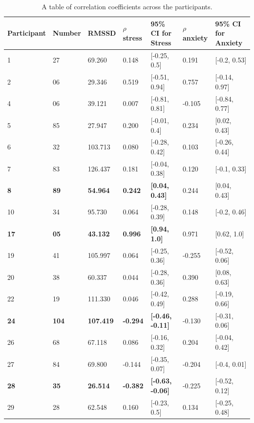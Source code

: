 \documentclass[11pt, a4paper, oneside]{article}
\begin{document}
\begin{table}[H]
    \centering
    \caption{A table of correlation coefficients across the participants.}
    \begin{tabularx}{\textwidth}{XXXXXXX}
        \toprule
        \textbf{Participant} & \textbf{Number} & \textbf{RMSSD} & \textbf{${\rho}$ stress} & \textbf{95\% CI for Stress} & \textbf{${\rho}$ anxiety} & \textbf{95\% CI for Anxiety}\\
        \midrule
        1    & 27   & 69.260  & 0.148 & [-0.25, 0.5] & 0.191 & [-0.2, 0.53]\\
        2    & 06   & 29.346  & 0.519 & [-0.51, 0.94]& 0.757 &[-0.14, 0.97]\\
        4    & 06   & 39.121  & 0.007 & [-0.81, 0.81] & -0.105 &[-0.84, 0.77]\\
        5    & 85   & 27.947  & 0.200 & [-0.01, 0.4] & 0.234 & [0.02, 0.43]\\
        6    & 32   & 103.713& 0.080 & [-0.28, 0.42] & 0.103 &[-0.26, 0.44]\\
        7    & 83   & 126.437 & 0.181 & [-0.04, 0.38] & 0.120 & [-0.1, 0.33]\\
        \textbf{8}    & \textbf{89}   & \textbf{54.964}   & \textbf{0.242} & \textbf{[0.04, 0.43]} & 0.244 & [0.04, 0.43]\\
        10  & 34   & 95.730   & 0.064 & [-0.28, 0.39] & 0.148 & [-0.2, 0.46]\\
        \textbf{17}  & \textbf{05}   & \textbf{43.132}    & \textbf{0.996} & \textbf{[0.94, 1.0]} & 0.971 & [0.62, 1.0]\\
        19  & 41   & 105.997 & 0.064 & [-0.25, 0.36] & -0.255 &[-0.52, 0.06]\\
        20  & 38   & 60.337   & 0.044 & [-0.28, 0.36] & 0.390 & [0.08, 0.63]\\
        22  & 19   & 111.330& 0.046 & [-0.42, 0.49] & 0.288 & [-0.19, 0.66]\\
        \textbf{24}  & \textbf{104} & \textbf{107.419}& \textbf{-0.294}& \textbf{[-0.46, -0.11]} & -0.130 & [-0.31, 0.06]\\
        26  & 68   & 67.118  & 0.086 & [-0.16, 0.32] & 0.204 & [-0.04, 0.42]\\
        27  & 84   & 69.800   & -0.144& [-0.35, 0.07] & -0.204 & [-0.4, 0.01]\\
        \textbf{28}  & \textbf{35}   & \textbf{26.514}  & \textbf{-0.382}& \textbf{[-0.63, -0.06]} & -0.225 & [-0.52, 0.12]\\
        29  & 28   & 62.548  & 0.160 & [-0.23, 0.5] & 0.134 & [-0.25, 0.48]\\

\end{tabularx}
\end{table}
\end{document}

